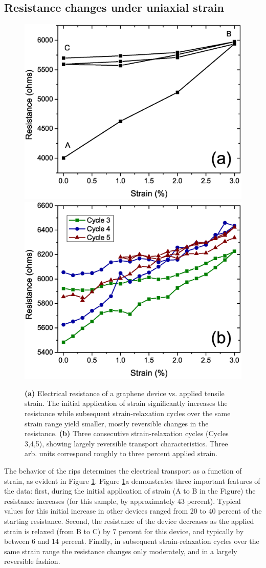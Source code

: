 \documentclass[edeposit,fullpage,draftthesis]{uiucthesis2009}
\begin{document}
    \subsection{Resistance changes under uniaxial strain}
    
        \begin{figure}
        \centering
        \includegraphics[width=0.49\linewidth]{images/resultsanddiscussion/rippingpaper/Fig2a.eps}
        \includegraphics[width=0.49\linewidth]{images/resultsanddiscussion/rippingpaper/Fig2b.eps}
            \caption[Resistance vs strain for graphene on flexible substrates]{
                \textbf{(a)} Electrical resistance of a graphene device vs. applied tensile strain. 
                The initial application of strain significantly increases the resistance while subsequent 
                strain-relaxation cycles over the same strain range yield smaller, mostly reversible 
                changes in the resistance. \textbf{(b)} Three consecutive strain-relaxation cycles 
                (Cycles 3,4,5), showing largely reversible transport characteristics. Three arb. units 
                correspond roughly to three percent applied strain.}
        \label{fig:rip-RvsStrain}
        \end{figure}
   
        The behavior of the rips determines the electrical transport as a function of
        strain, as evident in Figure \ref{fig:rip-RvsStrain}. Figure \ref{fig:rip-RvsStrain}a 
        demonstrates three important features
        of the data: first, during the initial application of strain (A to B in the
        Figure) the resistance increases (for this sample, by approximately 43
        percent). Typical values for this initial increase in other devices ranged from
        20 to 40 percent of the starting resistance. Second, the resistance of the
        device decreases as the applied strain is relaxed (from B to C) by 7 percent
        for this device, and typically by between 6 and 14 percent. Finally, in
        subsequent strain-relaxation cycles over the same strain range the resistance
        changes only moderately, and in a largely reversible fashion.
        
\end{document}
